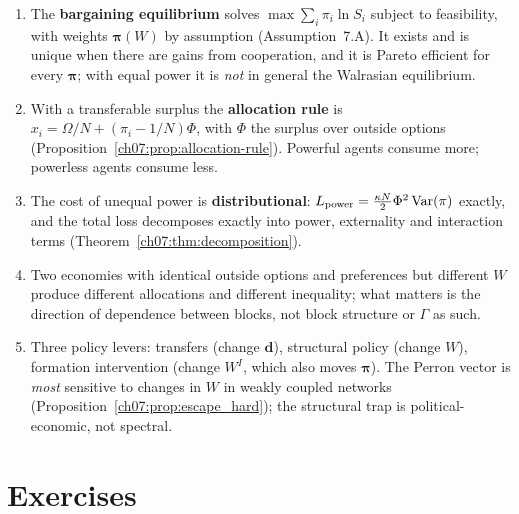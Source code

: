 \documentclass[../structural_economics_book.tex]{subfiles}
\begin{document}
\begin{enumerate}
\item The \textbf{bargaining equilibrium} solves $\max \sum_i \pi_i \ln S_i$ subject to feasibility, with weights $\boldsymbol{\pi}(W)$ by assumption (Assumption~7.A). It exists and is unique when there are gains from cooperation, and it is Pareto efficient for every $\boldsymbol{\pi}$; with equal power it is \emph{not} in general the Walrasian equilibrium.

\item With a transferable surplus the \textbf{allocation rule} is $x_i = \Omega/N + (\pi_i - 1/N)\Phi$, with $\Phi$ the surplus over outside options (Proposition~\ref{ch07:prop:allocation-rule}). Powerful agents consume more; powerless agents consume less.

\item The cost of unequal power is \textbf{distributional}: $L_{\text{power}} = \frac{\kappa N}{2}\Phi^2\operatorname{Var}(\pi)$ exactly, and the total loss decomposes exactly into power, externality and interaction terms (Theorem~\ref{ch07:thm:decomposition}).

\item Two economies with identical outside options and preferences but different $W$ produce different allocations and different inequality; what matters is the direction of dependence between blocks, not block structure or $\Gamma$ as such.

\item Three policy levers: transfers (change $\boldsymbol{d}$), structural policy (change $W$), formation intervention (change $W^I$, which also moves $\boldsymbol{\pi}$). The Perron vector is \emph{most} sensitive to changes in $W$ in weakly coupled networks (Proposition~\ref{ch07:prop:escape_hard}); the structural trap is political-economic, not spectral.
\end{enumerate}


\section{Exercises}
\label{ch07:sec:exercises}
\end{document}
